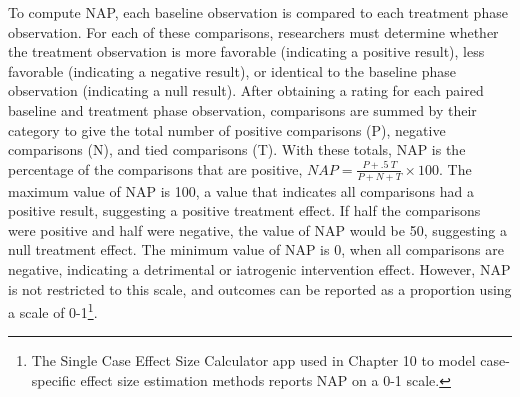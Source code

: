 \documentclass[
]{book}
\begin{document}
To compute NAP, each baseline observation is compared to each treatment phase observation. For each of these comparisons, researchers must determine whether the treatment observation is more favorable (indicating a positive result), less favorable (indicating a negative result), or identical to the baseline phase observation (indicating a null result). After obtaining a rating for each paired baseline and treatment phase observation, comparisons are summed by their category to give the total number of positive comparisons (P), negative comparisons (N), and tied comparisons (T). With these totals, NAP is the percentage of the comparisons that are positive, \(NAP = \frac{P + .5\ T}{P + N + T} \times 100\). The maximum value of NAP is 100, a value that indicates all comparisons had a positive result, suggesting a positive treatment effect. If half the comparisons were positive and half were negative, the value of NAP would be 50, suggesting a null treatment effect. The minimum value of NAP is 0, when all comparisons are negative, indicating a detrimental or iatrogenic intervention effect. However, NAP is not restricted to this scale, and outcomes can be reported as a proportion using a scale of 0-1\footnote{The Single Case Effect Size Calculator \citep{pustejovsky2023SingleCaseES} app used in Chapter 10 to model case-specific effect size estimation methods reports NAP on a 0-1 scale.}.
\end{document}
